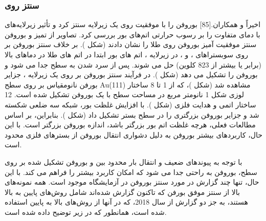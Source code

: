 \subsubsection{سنتز روی }
اخیراً  و همکاران.\cite{kiralyBoropheneSynthesisAu2019}[85] بوروفن را با موفقیت روی یک زیرلایه  سنتز کرد و تأثیر زیرلایه‌های  با دمای متفاوت را بر رسوب حرارتی اتم‌های بور بررسی کرد. تصاویر  از تمیز  و بوروفن سنتز موفقیت آمیز بوروفن روی طلا را نشان دادند (شکل ). بر خلاف سنتز بوروفن بر روی سوبستراهای ،  و ، در زیرلایه ، اتم های بور ابتدا در اتم های طلا در دماهای بالا (برابر یا بیشتر از 823 کلوین) حل می شوند. پس از سرد شدن به سطح جدا می شود و بوروفن را تشکیل می دهد (شکل ). در فرآیند سنتز بوروفن بر روی یک زیرلایه ، جزایر بورفن نانومقیاس بر روی سطح Au(111) مشاهده شد (شکل )، که از 1 تا 8 ساختار لوزی شکل 1 نانومتر مربع در مساحت سطح با یک بوروفن تشکیل شده است. 12 ساختار اتمی و هدایت فلزی (شکل ). با افزایش غلظت بور، شبکه سه ضلعی شکسته شد و جزایر بوروفن بزرگتری را در سطح بستر تشکیل داد (شکل ). بنابراین، بر اساس مطالعات فعلی، هرچه غلظت اتم بور بزرگتر باشد، اندازه بوروفن بزرگتر است. با این حال، کاربردهای بیشتر بوروفن به دلیل دشواری انتقال بوروفن از بسترهای فلزی محدود است.

با توجه به پیوندهای ضعیف و انتقال بار محدود بین  و بوروفن تشکیل شده بر روی سطح، بوروفن به راحتی جدا می شود که امکان کاربرد بیشتر را فراهم می کند. با این حال، تنها چند گزارش در مورد سنتز بوروفن در آزمایشگاه موجود است. همه نمونه‌های بالا از سنتز موفق بورفن که تاکنون گزارش شده‌اند شامل روش‌های پایین به بالا هستند، به جز دو گزارش از سال 2018، که در آنها از روش‌های بالا به پایین استفاده شده است، همانطور که در زیر توضیح داده شده است.
